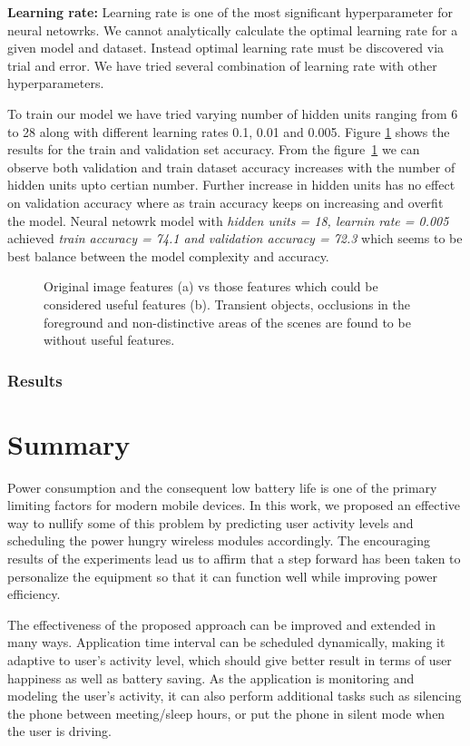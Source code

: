\textbf{Learning rate:} Learning rate is one of the most significant hyperparameter for neural netowrks. We cannot analytically calculate the optimal learning rate for a given model and dataset. Instead optimal learning rate must be discovered via trial and error. We have tried several combination of learning rate with other hyperparameters.

To train our model we have tried varying number of hidden units ranging from 6 to 28 along with different learning rates 0.1, 0.01 and 0.005. Figure \ref{fig:learning_rate_hiddenlayer01} shows the results for the train and validation set accuracy. From the figure~\ref{fig:learning_rate_hiddenlayer01} we can observe both validation and train dataset accuracy increases with the number of hidden units upto certian number. Further increase in hidden units has no effect on validation accuracy where as train accuracy keeps on increasing and overfit the model. Neural netowrk model with \textit{ hidden units = 18, learnin rate = 0.005} achieved \textit{train accuracy = 74.1 and validation accuracy = 72.3} which seems to be best balance between the model complexity and accuracy.
\begin{figure}[h]
\centering
{}
\caption{Original image features (a) vs those features which could 
be considered useful features (b). Transient objects, occlusions in the 
foreground and non-distinctive areas of the scenes are found to 
be without useful features.}
\label{fig:learning_rate_hiddenlayer01}
\end{figure}
\subsubsection{Results}


\section{Summary}
Power consumption and the consequent low battery life is one of the primary limiting factors for modern mobile devices.
In this work, we proposed an effective way to nullify some of this problem by predicting user activity levels and scheduling
the power hungry wireless modules accordingly. The encouraging results of the experiments lead us to affirm that a step
forward has been taken to personalize the equipment so that it can function well while improving power efficiency.

The effectiveness of the proposed approach can be improved and extended in many ways. Application time interval
can be scheduled dynamically, making it adaptive to user's activity level, which should give better result in terms of user happiness
as well as battery saving. As the application is monitoring and modeling the user's activity, it can also perform additional tasks
such as silencing the phone between meeting/sleep hours, or put the phone in silent mode when the user is driving.
